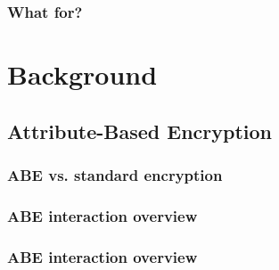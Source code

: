 \begin{frame}[c]
    \frametitle{What for?}
    
\end{frame}

\section{Background}
\subsection{Attribute-Based Encryption}
\begin{frame}[c]
    \frametitle{ABE vs. standard encryption}
    \begin{center}
        
    \end{center}
\end{frame}

\begin{frame}[c]
    \frametitle{ABE interaction overview}
    
\end{frame}

\begin{frame}[c]
    \frametitle{ABE interaction overview}
    
\end{frame}

